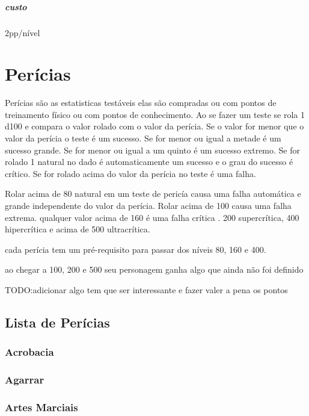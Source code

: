 \paragraph{custo} 2pp/nível
%
%
%
%
\chapter{Perícias}
Perícias são as estatisticas testáveis elas são compradas ou com pontos de treinamento físico ou com pontos de conhecimento.
Ao se fazer um teste se rola 1 d100 e compara o valor rolado com o valor da perícia.
Se o valor for menor que o valor da perícia o teste é um sucesso.
Se for menor ou igual a metade é um sucesso grande.
Se for menor ou igual a um quinto é um sucesso extremo.
Se for rolado 1 natural no dado é automaticamente um sucesso e o grau do sucesso é crítico.
Se for rolado acima do valor da perícia no teste é uma falha.

Rolar acima de 80 natural em um teste de pericía causa uma falha automática e grande independente do valor da perícia.
Rolar acima de 100 causa uma falha extrema. qualquer valor acima de 160 é uma falha crítica .
200 supercrítica, 400 hipercrítica e acima de 500 ultracrítica.

cada perícia tem um pré-requisito para passar dos níveis 80, 160 e 400.


ao chegar a 100, 200 e 500 seu personagem ganha algo que ainda não foi definido


TODO:adicionar algo tem que ser interessante e fazer valer a pena os pontos
%
%
\section{Lista de Perícias}
\subsection{Acrobacia}
\subsection{Agarrar}
\subsection{Artes Marciais}
